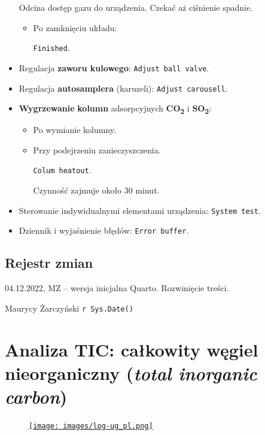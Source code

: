 \documentclass[
  letterpaper,
  DIV=11,
  numbers=noendperiod]{scrreprt}
\begin{document}
\begin{itemize}
  Odcina dostęp gazu do urządzenia. Czekać aż ciśnienie spadnie.

  \begin{itemize}
  \item
    Po zamknięciu układu:

    \texttt{Finished}.
  \end{itemize}
\item
  Regulacja \textbf{zaworu kulowego}: \texttt{Adjust\ ball\ valve}.
\item
  Regulacja \textbf{autosamplera} (karuzeli):
  \texttt{Adjust\ carousell}.
\item
  \textbf{Wygrzewanie} \textbf{kolumn} adsorpcyjnych
  \textbf{CO\textsubscript{2}} i \textbf{SO\textsubscript{2}}:

  \begin{itemize}
  \item
    Po wymianie kolumny.
  \item
    Przy podejrzeniu zanieczyszczenia.

    \texttt{Colum\ heatout}.

    Czynność zajmuje około 30 minut.
  \end{itemize}
\item
  Sterowanie indywidualnymi elementami urządzenia:
  \texttt{System\ test}.
\item
  Dziennik i wyjaśnienie błędów: \texttt{Error\ buffer}.\newpage{}
\end{itemize}

\hypertarget{rejestr-zmian-4}{%
\section{Rejestr zmian}\label{rejestr-zmian-4}}

04.12.2022, MZ -- wersja inicjalna Quarto. Rozwinięcie treści.

Maurycy Żarczyński \texttt{r\ Sys.Date()}

\hypertarget{analiza-tic-caux142kowity-wux119giel-nieorganiczny-total-inorganic-carbon}{%
\chapter{\texorpdfstring{Analiza TIC: całkowity węgiel nieorganiczny
(\emph{total inorganic
carbon})}{Analiza TIC: całkowity węgiel nieorganiczny (total inorganic carbon)}}\label{analiza-tic-caux142kowity-wux119giel-nieorganiczny-total-inorganic-carbon}}

\begin{figure}

\href{https://geomorfologia.ug.edu.pl}{\texttt{[image: images/log-ug\_pl.png]}}

\end{figure}
\end{document}
